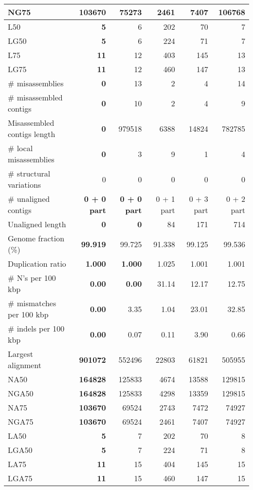 \documentclass[12pt,a4paper]{article}
\begin{document}
\begin{table}[ht]
\begin{center}
\begin{tabular}{|l*{5}{|r}|}
NG75 & 103670 & 75273 & 2461 & 7407 & {\bf 106768} \\ \hline
L50 & {\bf 5} & 6 & 202 & 70 & 7 \\ \hline
LG50 & {\bf 5} & 6 & 224 & 71 & 7 \\ \hline
L75 & {\bf 11} & 12 & 403 & 145 & 13 \\ \hline
LG75 & {\bf 11} & 12 & 460 & 147 & 13 \\ \hline
\# misassemblies & {\bf 0} & 13 & 2 & 4 & 14 \\ \hline
\# misassembled contigs & {\bf 0} & 10 & 2 & 4 & 9 \\ \hline
Misassembled contigs length & {\bf 0} & 979518 & 6388 & 14824 & 782785 \\ \hline
\# local misassemblies & {\bf 0} & 3 & 9 & 1 & 4 \\ \hline
\# structural variations & 0 & 0 & 0 & 0 & 0 \\ \hline
\# unaligned contigs & {\bf 0 + 0 part} & {\bf 0 + 0 part} & 0 + 1 part & 0 + 3 part & 0 + 2 part \\ \hline
Unaligned length & {\bf 0} & {\bf 0} & 84 & 171 & 714 \\ \hline
Genome fraction (\%) & {\bf 99.919} & 99.725 & 91.338 & 99.125 & 99.536 \\ \hline
Duplication ratio & {\bf 1.000} & {\bf 1.000} & 1.025 & 1.001 & 1.001 \\ \hline
\# N's per 100 kbp & {\bf 0.00} & {\bf 0.00} & 31.14 & 12.17 & 12.75 \\ \hline
\# mismatches per 100 kbp & {\bf 0.00} & 3.35 & 1.04 & 23.01 & 32.85 \\ \hline
\# indels per 100 kbp & {\bf 0.00} & 0.07 & 0.11 & 3.90 & 0.66 \\ \hline
Largest alignment & {\bf 901072} & 552496 & 22803 & 61821 & 505955 \\ \hline
NA50 & {\bf 164828} & 125833 & 4674 & 13588 & 129815 \\ \hline
NGA50 & {\bf 164828} & 125833 & 4298 & 13359 & 129815 \\ \hline
NA75 & {\bf 103670} & 69524 & 2743 & 7472 & 74927 \\ \hline
NGA75 & {\bf 103670} & 69524 & 2461 & 7407 & 74927 \\ \hline
LA50 & {\bf 5} & 7 & 202 & 70 & 8 \\ \hline
LGA50 & {\bf 5} & 7 & 224 & 71 & 8 \\ \hline
LA75 & {\bf 11} & 15 & 404 & 145 & 15 \\ \hline
LGA75 & {\bf 11} & 15 & 460 & 147 & 15 \\ \hline
\end{tabular}
\end{center}
\end{table}
\end{document}
